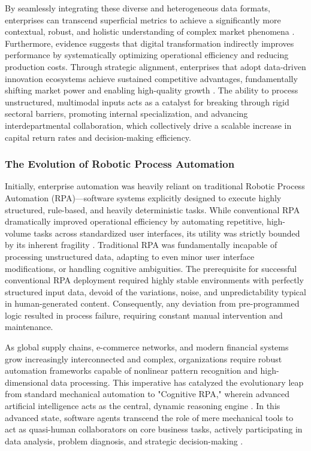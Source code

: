 By seamlessly integrating these diverse and heterogeneous data formats, enterprises can transcend superficial metrics to achieve a significantly more contextual, robust, and holistic understanding of complex market phenomena \parencite{sura2025multimodal}. Furthermore, evidence suggests that digital transformation indirectly improves performance by systematically optimizing operational efficiency and reducing production costs. Through strategic alignment, enterprises that adopt data-driven innovation ecosystems achieve sustained competitive advantages, fundamentally shifting market power and enabling high-quality growth \parencite{khan2025adaptive}. The ability to process unstructured, multimodal inputs acts as a catalyst for breaking through rigid sectoral barriers, promoting internal specialization, and advancing interdepartmental collaboration, which collectively drive a scalable increase in capital return rates and decision-making efficiency.

\subsubsection{The Evolution of Robotic Process Automation}
Initially, enterprise automation was heavily reliant on traditional Robotic Process Automation (RPA)—software systems explicitly designed to execute highly structured, rule-based, and heavily deterministic tasks. While conventional RPA dramatically improved operational efficiency by automating repetitive, high-volume tasks across standardized user interfaces, its utility was strictly bounded by its inherent fragility \parencite{peng2022digital}. Traditional RPA was fundamentally incapable of processing unstructured data, adapting to even minor user interface modifications, or handling cognitive ambiguities. The prerequisite for successful conventional RPA deployment required highly stable environments with perfectly structured input data, devoid of the variations, noise, and unpredictability typical in human-generated content. Consequently, any deviation from pre-programmed logic resulted in process failure, requiring constant manual intervention and maintenance.

As global supply chains, e-commerce networks, and modern financial systems grow increasingly interconnected and complex, organizations require robust automation frameworks capable of nonlinear pattern recognition and high-dimensional data processing. This imperative has catalyzed the evolutionary leap from standard mechanical automation to "Cognitive RPA," wherein advanced artificial intelligence acts as the central, dynamic reasoning engine \parencite{khan2025adaptive}. In this advanced state, software agents transcend the role of mere mechanical tools to act as quasi-human collaborators on core business tasks, actively participating in data analysis, problem diagnosis, and strategic decision-making \parencite{kephart2021multimodal}.

